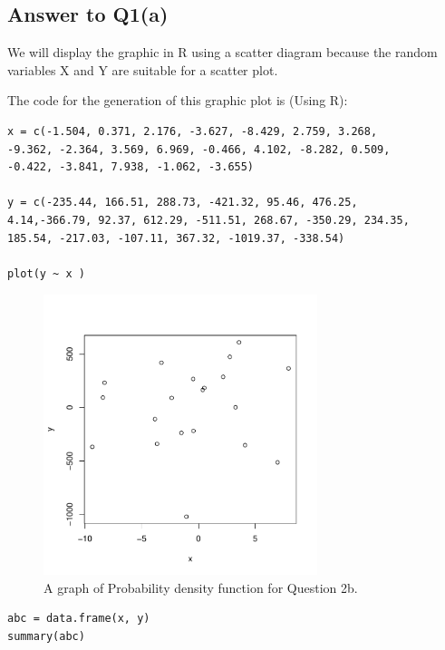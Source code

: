 \subsection{Answer to Q1(a)}
We will display the graphic in R using a scatter diagram because the random variables X and Y are suitable for a scatter plot.


The code for the generation of this graphic plot is (Using R):
\begin{verbatim}
x = c(-1.504, 0.371, 2.176, -3.627, -8.429, 2.759, 3.268,
-9.362, -2.364, 3.569, 6.969, -0.466, 4.102, -8.282, 0.509, 
-0.422, -3.841, 7.938, -1.062, -3.655)

y = c(-235.44, 166.51, 288.73, -421.32, 95.46, 476.25,
4.14,-366.79, 92.37, 612.29, -511.51, 268.67, -350.29, 234.35,
185.54, -217.03, -107.11, 367.32, -1019.37, -338.54)

plot(y ~ x )
\end{verbatim}

\begin{figure}[h]
\centering
\includegraphics[width=8cm]{pics/Rplot2a.pdf}
\caption{A graph of Probability density function for Question 2b.}
\label{fig:1c}
\end{figure}
\FloatBarrier

\begin{verbatim}
abc = data.frame(x, y)
summary(abc)
\end{verbatim}

